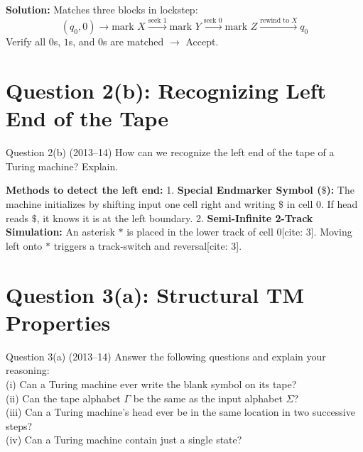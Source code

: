 \documentclass[11pt,a4paper]{article}
\begin{document}
\begin{solutionbox}
\textbf{Solution:} Matches three blocks in lockstep:
$$(q_0, 0) \rightarrow \text{mark } X \xrightarrow{\text{seek } 1} \text{mark } Y \xrightarrow{\text{seek } 0} \text{mark } Z \xrightarrow{\text{rewind to } X} q_0$$
Verify all $0$s, $1$s, and $0$s are matched $\rightarrow$ Accept.
\end{solutionbox}

\section{Question 2(b): Recognizing Left End of the Tape}
\begin{questionbox}{Question 2(b) (2013--14)}
How can we recognize the left end of the tape of a Turing machine? Explain.
\end{questionbox}

\begin{solutionbox}
\textbf{Methods to detect the left end:}
1. \textbf{Special Endmarker Symbol ($\$$):} The machine initializes by shifting input one cell right and writing $\$$ in cell 0. If head reads $\$$, it knows it is at the left boundary.
2. \textbf{Semi-Infinite 2-Track Simulation:} An asterisk $*$ is placed in the lower track of cell 0[cite: 3]. Moving left onto $*$ triggers a track-switch and reversal[cite: 3].
\end{solutionbox}

\section{Question 3(a): Structural TM Properties}
\begin{questionbox}{Question 3(a) (2013--14)}
Answer the following questions and explain your reasoning: \\
(i) Can a Turing machine ever write the blank symbol on its tape? \\
(ii) Can the tape alphabet $\Gamma$ be the same as the input alphabet $\Sigma$? \\
(iii) Can a Turing machine's head ever be in the same location in two successive steps? \\
(iv) Can a Turing machine contain just a single state?
\end{questionbox}
\end{document}
